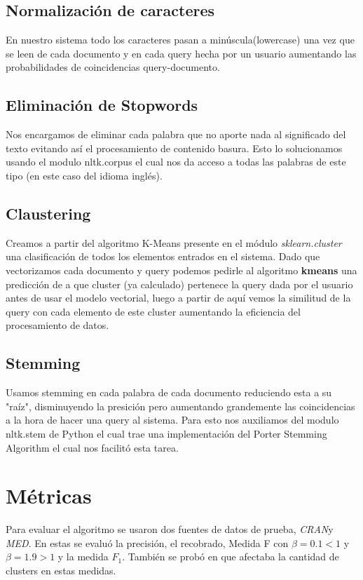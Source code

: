 \documentclass{llncs}
\begin{document}
	
	
	
	\subsection{Normalizaci\'on de caracteres }
	
	En nuestro sistema todo los caracteres pasan a min\'uscula(lowercase) una vez que se leen de cada documento y en cada query hecha por un usuario aumentando las probabilidades de  coincidencias query-documento. 
	
	\subsection{Eliminaci\'on de Stopwords}
	Nos encargamos de eliminar cada palabra que no aporte nada al significado del texto evitando as\'i el procesamiento de contenido basura. Esto lo solucionamos usando el modulo nltk.corpus el cual nos da acceso a todas las palabras de este tipo (en este caso del idioma ingl\'es).
	
	
	\subsection{Claustering}
	Creamos a partir del algoritmo K-Means presente en el m\'odulo \textit{sklearn.cluster} una clasificaci\'on de todos los elementos entrados en el sistema. Dado que vectorizamos cada documento y query podemos pedirle al algoritmo \textbf{kmeans} una predicci\'on de a que cluster (ya calculado) pertenece la query dada por el usuario antes de usar el modelo vectorial, luego a partir de aqu\'i vemos la similitud de la query con cada elemento de este cluster aumentando la eficiencia del procesamiento de datos. 
	
	
	
	\subsection{Stemming}
	Usamos stemming en cada palabra de cada documento  reduciendo esta a su "ra\'iz", disminuyendo la presici\'on pero aumentando grandemente las coincidencias a la hora de hacer una query al sistema. Para esto nos auxiliamos del modulo nltk.stem de Python el cual trae una implementaci\'on del Porter Stemming Algorithm el cual nos facilit\'o esta tarea. 
	
	
	
	
	
	\section{M\'etricas}
	Para evaluar el algoritmo se usaron dos fuentes de datos de prueba, \textit{CRAN}y \textit{MED}. En estas se evalu\'o la precisi\'on, el recobrado, Medida F con $\beta = 0.1 < 1$ y $\beta = 1.9 > 1$ y la medida $F_1$. Tambi\'en se prob\'o en que afectaba la cantidad de clusters en estas medidas.
	
\end{document}
